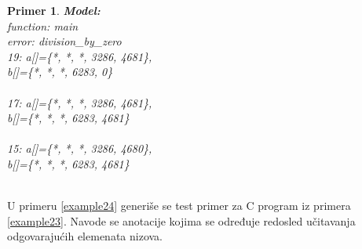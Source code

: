 \documentclass[12pt,oneside]{memoir}
\newtheorem{primer}{Primer}
\begin{document}
\begin{primer}
\hspace{1.1cm}
\begin{minipage}[t]{0.4\textwidth}
\vspace{-10.48cm}
\textbf{Model:}\\
function: main \\
error: division\_by\_zero \\
19: a[]=\{*, *, *, 3286, 4681\}, \\ b[]=\{*, *, *, 6283, 0\} \\ \\
17: a[]=\{*, *, *, 3286, 4681\}, \\ b[]=\{*, *, *, 6283, 4681\} \\ \\
15: a[]=\{*, *, *, 3286, 4680\}, \\ b[]=\{*, *, *, 6283, 4681\} \\ \\
\end{minipage}
\end{primer} 
\par
U primeru \ref{example24} generiše se test primer za C program iz primera \ref{example23}. Navode se anotacije kojima se određuje redosled učitavanja odgovarajućih elemenata nizova.
 
\end{document}
